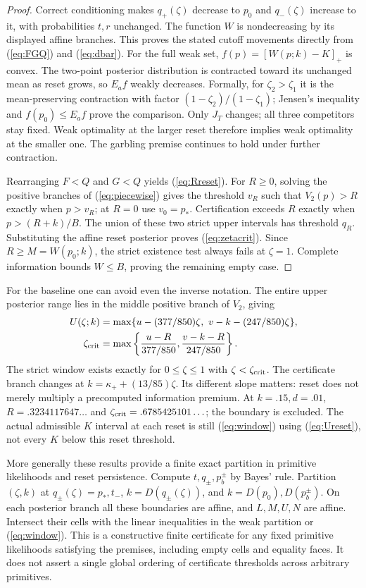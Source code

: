 \begin{proof}
Correct conditioning makes $q_+(\zeta)$ decrease to $p_0$ and $q_-(\zeta)$ increase to it, with probabilities $t,r$ unchanged. The function $W$ is nondecreasing by its displayed affine branches. This proves the stated cutoff movements directly from (\ref{eq:FGQ}) and (\ref{eq:dbar}). For the full weak set, $f(p)=[W(p;k)-K]_+$ is convex. The two-point posterior distribution is contracted toward its unchanged mean as reset grows, so $E_af$ weakly decreases. Formally, for $\zeta_2>\zeta_1$ it is the mean-preserving contraction with factor $(1-\zeta_2)/(1-\zeta_1)$; Jensen's inequality and $f(p_0)\leq E_af$ prove the comparison. Only $J_T$ changes; all three competitors stay fixed. Weak optimality at the larger reset therefore implies weak optimality at the smaller one. The garbling premise continues to hold under further contraction.

Rearranging $F<Q$ and $G<Q$ yields (\ref{eq:Rreset}). For $R\geq0$, solving the positive branches of (\ref{eq:piecewise}) gives the threshold $v_R$ such that $V_2(p)>R$ exactly when $p>v_R$; at $R=0$ use $v_0=p_*$. Certification exceeds $R$ exactly when $p>(R+k)/B$. The union of these two strict upper intervals has threshold $q_R$. Substituting the affine reset posterior proves (\ref{eq:zetacrit}). Since $R\geq M=W(p_0;k)$, the strict existence test always fails at $\zeta=1$. Complete information bounds $W\leq B$, proving the remaining empty case.
\end{proof}

For the baseline one can avoid even the inverse notation. The entire upper posterior range lies in the middle positive branch of $V_2$, giving
\begin{align}
 U(\zeta;k)&=\max\{u-(377/850)\zeta,\ v-k-(247/850)\zeta\},\label{eq:Ureset}\\
 \zeta_{\rm crit}&=\max\left\{\frac{u-R}{377/850},\frac{v-k-R}{247/850}\right\}.\label{eq:zetabase}
\end{align}
The strict window exists exactly for $0\leq\zeta\leq1$ with $\zeta<\zeta_{\rm crit}$. The certificate branch changes at $k=\kappa_++(13/85)\zeta$. Its different slope matters: reset does not merely multiply a precomputed information premium. At $k=.15,d=.01$, $R=.3234117647\ldots$ and $\zeta_{\rm crit}=.6785425101\ldots$; the boundary is excluded. The actual admissible $K$ interval at each reset is still (\ref{eq:window}) using (\ref{eq:Ureset}), not every $K$ below this reset threshold.

More generally these results provide a finite exact partition in primitive likelihoods and reset persistence. Compute $t,q_\pm,p_b^\pm$ by Bayes' rule. Partition $(\zeta,k)$ at $q_\pm(\zeta)=p_*,t_-$, $k=D(q_\pm(\zeta))$, and $k=D(p_0),D(p_b^\pm)$. On each posterior branch all these boundaries are affine, and $L,M,U,N$ are affine. Intersect their cells with the linear inequalities in the weak partition or (\ref{eq:window}). This is a constructive finite certificate for any fixed primitive likelihoods satisfying the premises, including empty cells and equality faces. It does not assert a single global ordering of certificate thresholds across arbitrary primitives.


